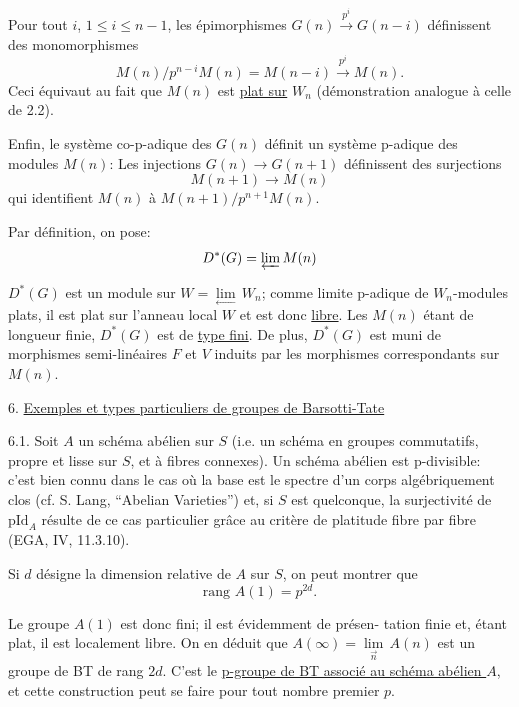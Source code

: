 \documentclass[11pt]{article}
\newcommand{\scanpage}[1]{\par\bigskip\noindent{\small\sffamily[scan #1]}\par}
\newcommand{\mspage}[1]{{\small\sffamily[p.\,#1]}}
\newcommand{\hand}[1]{\textcolor{blue}{#1}}
\newcommand{\uline}[1]{\underline{#1}}
\begin{document}
Pour tout $i$, $1 \leq i \leq n-1$, les épimorphismes $G(n) \xrightarrow{p^{i}} G(n-i)$
définissent des monomorphismes
\[ M(n)/p^{n-i}M(n) = M(n-i) \xrightarrow{p^{i}} M(n) . \]
Ceci équivaut au fait que $M(n)$ est \uline{plat sur} $W_{n}$ (démonstration analogue
à celle de 2.2).

Enfin, le système co-p-adique des $G(n)$ définit un système
p-adique des modules $M(n)$: Les injections $G(n) \rightarrow G(n+1)$ définissent
des surjections
\[ M(n+1) \rightarrow M(n) \]
qui identifient $M(n)$ à $M(n+1)/p^{n+1}M(n)$.

Par définition, on pose:
\[ D^{*}(G) = \varprojlim M(n) \]

\mspage{\hand{66}}

\clearpage
\scanpage{129/67}
\mspage{\hand{III-12}}

$D^*(G)$ est un module sur $W = \underset{\leftarrow}{\lim}\, W_n$; comme limite p-adique
de $W_n$-modules plats, il est plat sur l'anneau local $W$ et est donc
\uline{libre}. Les $M(n)$ étant de longueur finie, $D^*(G)$ est de \uline{type fini}.
De plus, $D^*(G)$ est muni de morphismes semi-linéaires $F$ et $V$ induits
par les morphismes correspondants sur $M(n)$.

6. \uline{Exemples et types particuliers de groupes de Barsotti-Tate}

6.1. Soit $A$ un schéma abélien sur $S$ (i.e. un schéma en groupes
commutatifs, propre et lisse sur $S$, et à fibres connexes). Un schéma
abélien est p-divisible: c'est bien connu dans le cas où la base est
le spectre d'un corps algébriquement clos (cf. S. Lang, ``Abelian
Varieties'') et, si $S$ est quelconque, la surjectivité de $\mathrm{pId}_A$ résulte
de ce cas particulier grâce au critère de platitude fibre par fibre
(EGA, IV, 11.3.10).

Si $d$ désigne la dimension relative de $A$ sur $S$, on peut
montrer que
\[ \text{rang } A(1) = p^{2d} . \]

Le groupe $A(1)$ est donc fini; il est évidemment de présen-%
tation finie et, étant plat, il est localement libre. On en déduit que
$A(\infty) = \underset{\overrightarrow{n}}{\lim}\, A(n)$ est un groupe de BT de rang $2d$. C'est le \uline{p-groupe
de BT associé au schéma abélien $A$}, et cette construction peut se faire
pour tout nombre premier $p$.
\end{document}
